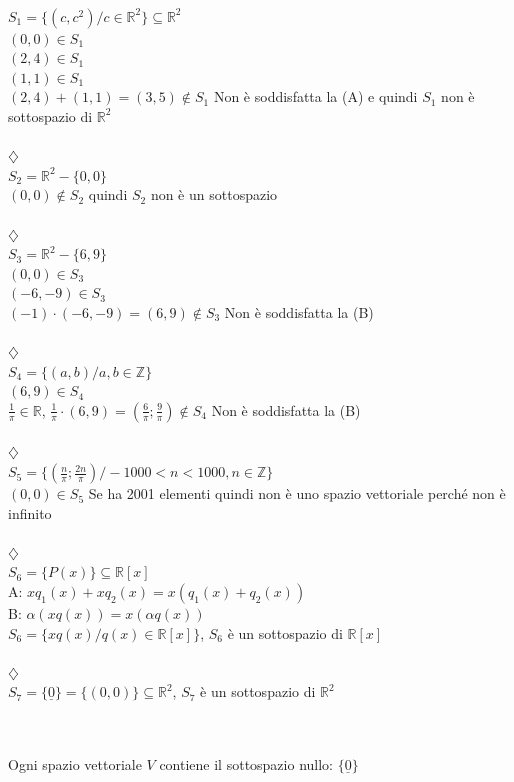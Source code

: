 \begin{es}
	\phantom{}\\
	$S_1=\{(c,c^2)/c\in\mathbb{R}^2\}\subseteq\mathbb{R}^2$\\
	$(0,0)\in S_1$\\ $(2,4)\in S_1$\\ $(1,1)\in S_1$\\ $(2,4)+(1,1)=(3,5)\notin S_1$ Non è soddisfatta la (A) e quindi $S_1$ non è sottospazio di $\mathbb{R}^2$\\\\$\diamondsuit$\\
	$S_2=\mathbb{R}^2-\{0,0\}$\\ $(0,0)\notin S_2$ quindi $S_2$ non è un sottospazio\\\\$\diamondsuit$\\
	$S_3=\mathbb{R}^2-\{6,9\}$\\ $(0,0)\in S_3$\\ $(-6,-9)\in S_3$\\ $(-1)\cdot(-6,-9)=(6,9)\notin S_3$ Non è soddisfatta la (B)\\\\$\diamondsuit$\\
	$S_4=\{(a,b)/a,b\in\mathbb{Z}\}$\\ $(6,9)\in S_4$\\ $\frac{1}{\pi}\in\mathbb{R}$, $\frac{1}{\pi}\cdot(6,9)=(\frac{6}{\pi};\frac{9}{\pi})\notin S_4$ Non è soddisfatta la (B)\\\\$\diamondsuit$\\
	$S_5=\{(\frac{n}{\pi};\frac{2n}{\pi})/-1000<n<1000, n\in\mathbb{Z}\}$\\
	$(0,0)\in S_5$ Se ha 2001 elementi quindi non è uno spazio vettoriale perché non è infinito\\\\$\diamondsuit$\\
	$S_6=\{P(x)\}\subseteq\mathbb{R}[x]$\\ A: $xq_1(x)+xq_2(x)=x(q_1(x)+q_2(x))$\\ B: $\alpha(xq(x))=x(\alpha q(x))$\\ $S_6=\{xq(x)/q(x)\in\mathbb{R}[x]\}$, $S_6$ è un sottospazio di $\mathbb{R}[x]$\\\\$\diamondsuit$\\
	$S_7=\{\underline{0}\}=\{(0,0)\}\subseteq\mathbb{R}^2$, $S_7$ è un sottospazio di $\mathbb{R}^2$
\end{es} 
\phantom{text}\\
\phantom{text}\\
Ogni spazio vettoriale $V$ contiene il sottospazio nullo: $\{\underline{0}\}$

